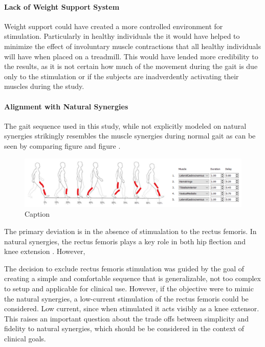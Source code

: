 \paragraph*{Lack of Weight Support System}
Weight support could have created a more controlled environment for stimulation. Particularly in healthy individuals the it would have helped to minimize the effect of involuntary muscle contractions that all healthy individuals will have when placed on a treadmill. This would have lended more credibility to the results, as it is not certain how much of the movement during the gait is due only to the stimulation or if the subjects are inadverdently activating their muscles during the study.
\newline 

\paragraph*{Alignment with Natural Synergies}

The gait sequence used in this study, while not explicitly modeled on natural synergies strikingly resembles the muscle synergies during normal gait as can be seen by comparing figure and figure .

\begin{figure}
    \centering
    \includegraphics[width=0.9\linewidth]{images/finalseq.png}
    \caption{Caption}
    \label{fig:enter-label}
\end{figure}

The primary deviation is in the absence of stimualation to the rectus femoris. In natural synergies, the rectus femoris plays a key role in both hip flection and knee extension . However, 

The decision to exclude rectus femoris stimulation was guided by the goal of creating a simple and comfortable sequence that is generalizable, not too complex to setup and applicable for clinical use. However, if the objective were to mimic the natural synergies, a low-current stimulation of the rectus femoris could be considered. Low current, since when stimulated it acts visibly as a knee extensor. This raises an important question about the trade offs between simplicity and fidelity to natural synergies, which should be be considered in the context of clinical goals.


